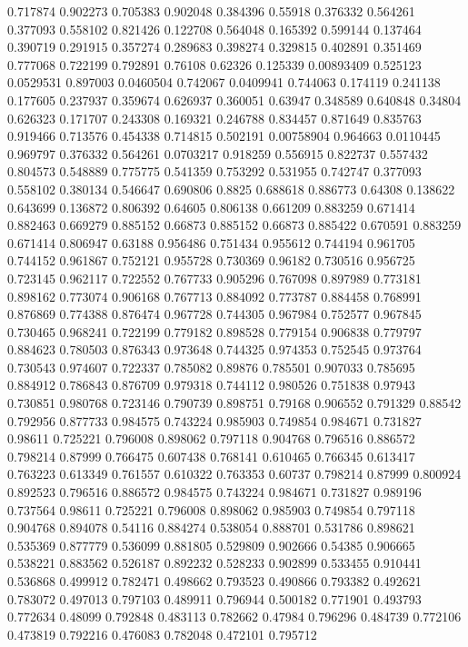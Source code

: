 0.717874 0.902273
0.705383 0.902048
0.384396 0.55918
0.376332 0.564261
0.377093 0.558102
0.821426 0.122708
0.564048 0.165392
0.599144 0.137464
0.390719 0.291915
0.357274 0.289683
0.398274 0.329815
0.402891 0.351469
0.777068 0.722199
0.792891 0.76108
0.62326 0.125339
0.00893409 0.525123
0.0529531 0.897003
0.0460504 0.742067
0.0409941 0.744063
0.174119 0.241138
0.177605 0.237937
0.359674 0.626937
0.360051 0.63947
0.348589 0.640848
0.34804 0.626323
0.171707 0.243308
0.169321 0.246788
0.834457 0.871649
0.835763 0.919466
0.713576 0.454338
0.714815 0.502191
0.00758904 0.964663
0.0110445 0.969797
0.376332 0.564261
0.0703217 0.918259
0.556915 0.822737
0.557432 0.804573
0.548889 0.775775
0.541359 0.753292
0.531955 0.742747
0.377093 0.558102
0.380134 0.546647
0.690806 0.8825
0.688618 0.886773
0.64308 0.138622
0.643699 0.136872
0.806392 0.64605
0.806138 0.661209
0.883259 0.671414
0.882463 0.669279
0.885152 0.66873
0.885152 0.66873
0.885422 0.670591
0.883259 0.671414
0.806947 0.63188
0.956486 0.751434
0.955612 0.744194
0.961705 0.744152
0.961867 0.752121
0.955728 0.730369
0.96182 0.730516
0.956725 0.723145
0.962117 0.722552
0.767733 0.905296
0.767098 0.897989
0.773181 0.898162
0.773074 0.906168
0.767713 0.884092
0.773787 0.884458
0.768991 0.876869
0.774388 0.876474
0.967728 0.744305
0.967984 0.752577
0.967845 0.730465
0.968241 0.722199
0.779182 0.898528
0.779154 0.906838
0.779797 0.884623
0.780503 0.876343
0.973648 0.744325
0.974353 0.752545
0.973764 0.730543
0.974607 0.722337
0.785082 0.89876
0.785501 0.907033
0.785695 0.884912
0.786843 0.876709
0.979318 0.744112
0.980526 0.751838
0.97943 0.730851
0.980768 0.723146
0.790739 0.898751
0.79168 0.906552
0.791329 0.88542
0.792956 0.877733
0.984575 0.743224
0.985903 0.749854
0.984671 0.731827
0.98611 0.725221
0.796008 0.898062
0.797118 0.904768
0.796516 0.886572
0.798214 0.87999
0.766475 0.607438
0.768141 0.610465
0.766345 0.613417
0.763223 0.613349
0.761557 0.610322
0.763353 0.60737
0.798214 0.87999
0.800924 0.892523
0.796516 0.886572
0.984575 0.743224
0.984671 0.731827
0.989196 0.737564
0.98611 0.725221
0.796008 0.898062
0.985903 0.749854
0.797118 0.904768
0.894078 0.54116
0.884274 0.538054
0.888701 0.531786
0.898621 0.535369
0.877779 0.536099
0.881805 0.529809
0.902666 0.54385
0.906665 0.538221
0.883562 0.526187
0.892232 0.528233
0.902899 0.533455
0.910441 0.536868
0.499912 0.782471
0.498662 0.793523
0.490866 0.793382
0.492621 0.783072
0.497013 0.797103
0.489911 0.796944
0.500182 0.771901
0.493793 0.772634
0.48099 0.792848
0.483113 0.782662
0.47984 0.796296
0.484739 0.772106
0.473819 0.792216
0.476083 0.782048
0.472101 0.795712

